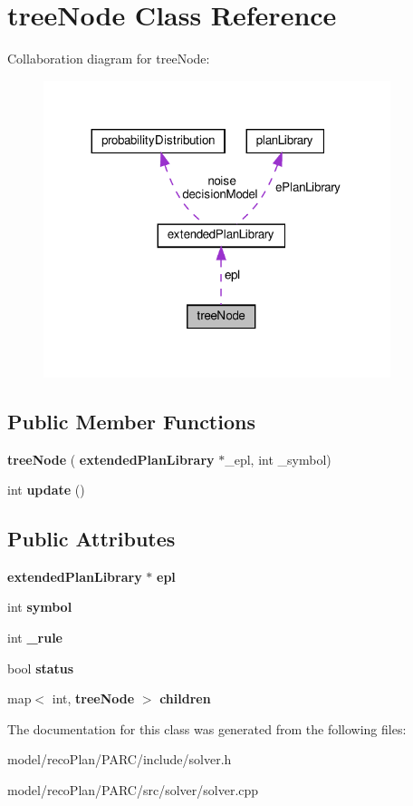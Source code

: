 \section{tree\+Node Class Reference}
\label{classtree_node}


Collaboration diagram for tree\+Node\+:
\nopagebreak
\begin{figure}[H]
\begin{center}
\leavevmode
\includegraphics[width=287pt]{classtree_node__coll__graph}
\end{center}
\end{figure}
\subsection*{Public Member Functions}
\begin{DoxyCompactItemize}
\item 
\mbox{\label{classtree_node_abd735f769cfebe48e8503ddb7f0e8ef6}} 
{\bfseries tree\+Node} (\textbf{ extended\+Plan\+Library} $\ast$\+\_\+epl, int \+\_\+symbol)
\item 
\mbox{\label{classtree_node_a17b78ee258c263487eeafa8126817c82}} 
int {\bfseries update} ()
\end{DoxyCompactItemize}
\subsection*{Public Attributes}
\begin{DoxyCompactItemize}
\item 
\mbox{\label{classtree_node_a747fc45b98bbf29fd6832a7a32c717a0}} 
\textbf{ extended\+Plan\+Library} $\ast$ {\bfseries epl}
\item 
\mbox{\label{classtree_node_a84cfebe97cbef1ae4f1c6bfa110677ba}} 
int {\bfseries symbol}
\item 
\mbox{\label{classtree_node_ad9b561da695aed55e432e03680332b7c}} 
int {\bfseries \+\_\+rule}
\item 
\mbox{\label{classtree_node_a0a2564e246dd61e694d812e93629fa83}} 
bool {\bfseries status}
\item 
\mbox{\label{classtree_node_afc2f0e77a278b60136c983e019403b1b}} 
map$<$ int, \textbf{ tree\+Node} $>$ {\bfseries children}
\end{DoxyCompactItemize}


The documentation for this class was generated from the following files\+:\begin{DoxyCompactItemize}
\item 
model/reco\+Plan/\+P\+A\+R\+C/include/solver.\+h\item 
model/reco\+Plan/\+P\+A\+R\+C/src/solver/solver.\+cpp\end{DoxyCompactItemize}
